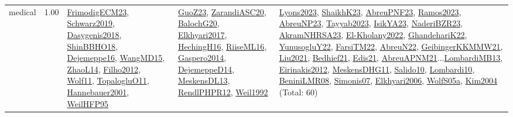 {\begin{longtable}{p{3cm}r>{\raggedright\arraybackslash}p{6cm}>{\raggedright\arraybackslash}p{6cm}>{\raggedright\arraybackslash}p{8cm}}
\index{medical}\index{ApplicationAreas!medical}medical &  1.00 & \hyperref[detail:FrimodigECM23]{FrimodigECM23}, \hyperref[detail:Schwarz2019]{Schwarz2019}, \hyperref[detail:Dasygenis2018]{Dasygenis2018}, \hyperref[detail:ShinBBHO18]{ShinBBHO18}, \hyperref[detail:Dejemeppe16]{Dejemeppe16}, \hyperref[detail:WangMD15]{WangMD15}, \hyperref[detail:ZhaoL14]{ZhaoL14}, \hyperref[detail:Filho2012]{Filho2012}, \hyperref[detail:Wolf11]{Wolf11}, \hyperref[detail:TopalogluO11]{TopalogluO11}, \hyperref[detail:Hannebauer2001]{Hannebauer2001}, \hyperref[detail:WeilHFP95]{WeilHFP95} & \hyperref[detail:GuoZ23]{GuoZ23}, \hyperref[detail:ZarandiASC20]{ZarandiASC20}, \hyperref[detail:BalochG20]{BalochG20}, \hyperref[detail:Elkhyari2017]{Elkhyari2017}, \hyperref[detail:HechingH16]{HechingH16}, \hyperref[detail:RiiseML16]{RiiseML16}, \hyperref[detail:Gaspero2014]{Gaspero2014}, \hyperref[detail:DejemeppeD14]{DejemeppeD14}, \hyperref[detail:MeskensDL13]{MeskensDL13}, \hyperref[detail:RendlPHPR12]{RendlPHPR12}, \hyperref[detail:Weil1992]{Weil1992} & \hyperref[detail:Lyons2023]{Lyons2023}, \hyperref[detail:ShaikhK23]{ShaikhK23}, \hyperref[detail:AbreuPNF23]{AbreuPNF23}, \hyperref[detail:Ramos2023]{Ramos2023}, \hyperref[detail:AbreuNP23]{AbreuNP23}, \hyperref[detail:Tayyab2023]{Tayyab2023}, \hyperref[detail:IsikYA23]{IsikYA23}, \hyperref[detail:NaderiBZR23]{NaderiBZR23}, \hyperref[detail:AkramNHRSA23]{AkramNHRSA23}, \hyperref[detail:El-Kholany2022]{El-Kholany2022}, \hyperref[detail:GhandehariK22]{GhandehariK22}, \hyperref[detail:YunusogluY22]{YunusogluY22}, \hyperref[detail:FarsiTM22]{FarsiTM22}, \hyperref[detail:AbreuN22]{AbreuN22}, \hyperref[detail:GeibingerKKMMW21]{GeibingerKKMMW21}, \hyperref[detail:Liu2021]{Liu2021}, \hyperref[detail:Bedhief21]{Bedhief21}, \hyperref[detail:Edis21]{Edis21}, \hyperref[detail:AbreuAPNM21]{AbreuAPNM21}...\hyperref[detail:LombardiMB13]{LombardiMB13}, \hyperref[detail:Eirinakis2012]{Eirinakis2012}, \hyperref[detail:MeskensDHG11]{MeskensDHG11}, \hyperref[detail:Salido10]{Salido10}, \hyperref[detail:Lombardi10]{Lombardi10}, \hyperref[detail:BeniniLMR08]{BeniniLMR08}, \hyperref[detail:Simonis07]{Simonis07}, \hyperref[detail:Elkhyari2006]{Elkhyari2006}, \hyperref[detail:WolfS05a]{WolfS05a}, \hyperref[detail:Kim2004]{Kim2004} (Total: 60)\\

\end{longtable}}
